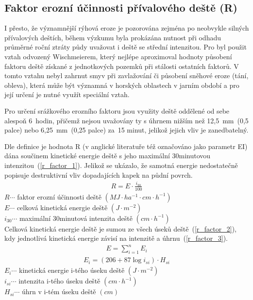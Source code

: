 \subsection{Faktor erozní účinnosti přívalového deště (R)}
I přesto, že významnější rýhová eroze je pozorována zejména po
neobvykle silných přívalových deštích, během výzkumu byla prokázána
nutnost při odhadu průměrné roční ztráty půdy uvažovat i deště se
střední intenzitou. Pro  byl použit vztah odvozený
Wischmeierem\cite{Wischmeier1959}, který nejlépe aproximoval hodnoty
působení faktoru deště získané z jednotkových pozemků při stálosti
ostatních faktorů. V tomto vztahu nebyl zahrnut smyv při zavlažování
či působení sněhové eroze (tání, obleva), která může být významná v
horských oblastech v jarním období a pro její určení je nutné využít
speciální vztah.

Pro určení srážkového erozního faktoru jsou využity deště oddělené od
sebe alespoň 6~hodin, přičemž nejsou uvažovány ty s úhrnem nižším než
12,5~mm~(0,5 palce) nebo 6,25~mm~(0,25 palce) za~15 minut, jelikož
jejich vliv je zanedbatelný.

Dle definice je hodnota R (v anglické literatuře též označováno jako
parametr EI) dána součinem kinetické energie deště s jeho maximální
30minutovou intenzitou~(\ref{r_factor_1}). Jelikož se ukázalo, že
samotná energie nedostatečně popisuje destruktivní vliv dopadajících
kapek na půdní povrch.\cite{usle1978}
\begin{align}
   \label{r_factor_1} R=E\cdot  \frac{i_{30}}{100}
\end{align}
\hspace*{2cm}$R \cdots$ faktor erozní účinnosti deště $\left( MJ\cdot
ha^{-1}\cdot cm \cdot h^{-1} \right)$\\
\hspace*{2cm}$E \cdots$ celková kinetická energie deště $\left( J\cdot
m^{-2} \right)$\\
\hspace*{2cm}$i_{30} \cdots$ maximální 30minutová intenzita deště
$\left( cm\cdot h^{-1} \right)$\\

Celková kinetická energie deště je sumou ze všech úseků
deště~(\ref{r_factor_2}), kdy jednotlivá kinetická energie závisí na
intenzitě a úhrnu~(\ref{r_factor_3}).\cite{usle1978}
\begin{align}
   \label{r_factor_2} E=\sum_{i=1}^n E_{i}
\end{align}
\begin{align}
   \label{r_factor_3} E_{i}=\left( 206+87 \log i_{si} \right) \cdot H_{si}
\end{align}
\hspace*{2cm}$E_{i} \cdots$ kinetická energie i-tého úseku deště
$\left( J\cdot m^{-2} \right)$\\
\hspace*{2cm}$i_{si} \cdots$ intenzita i-tého úseku deště $\left(
cm\cdot h^{-1} \right)$\\
\hspace*{2cm}$H_{si} \cdots$ úhrn v i-tém úseku deště $\left( cm
\right)$\\

